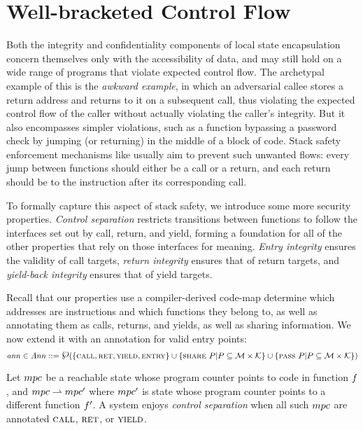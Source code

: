 \documentclass[acmsmall,review,anonymous]{acmart}\settopmatter{printfolios=true,printccs=false,printacmref=false}
\newcommand{\powerset}{\raisebox{.15\baselineskip}{\Large\ensuremath{\wp}}}
\begin{document}
\section{Well-bracketed Control Flow}
\label{sec:wbcf}

Both the integrity and confidentiality components of local state
encapsulation concern themselves only with the accessibility of data,
and may still hold on a wide range of programs that violate expected
control flow. The archetypal example of this is the {\em awkward example},
in which an adversarial callee stores a return address and returns to it
on a subsequent call, thus violating the expected control flow of the
caller without actually violating the caller's integrity. But it also
encompasses simpler violations, such as a function bypassing a password
check by jumping (or returning) in the middle of a block of code.
%
Stack safety enforcement mechanisms like \citet{Skorstengaard+19}
usually aim to prevent such unwanted flows: every jump between
functions should either be a call or a return, and each return should
be to the instruction after its corresponding call.

To formally capture this aspect of stack safety, we introduce some more
security properties. {\em Control separation} restricts transitions between
functions to follow the interfaces set out by call, return, and yield, forming
a foundation for all of the other properties that rely on those interfaces for
meaning. {\em Entry integrity} ensures the validity of call targets,
{\em return integrity} ensures that of return targets, and
{\em yield-back integrity} ensures that of yield targets.

Recall that our properties use a compiler-derived code-map determine
which addresses are instructions and which functions they belong to, as well
as annotating them as calls, returns, and yields, as well as sharing information.
We now extend it with an annotation for valid entry points:
\[\ann \in \ANNS ::= \powerset(\{\callmap, \retmap, \yieldmap, \entmap\} \cup
\{\sharemap ~ P | P \subseteq \MACHS \times \COMPONENTS \} \cup
\{\passmap ~ P | P \subseteq \MACHS \times \COMPONENTS \})\]


Let \(mpc\) be a reachable state whose program counter points to code in
function \(f\), and \(mpc \overset{}{\rightharpoonup} mpc'\) where
\(mpc'\) is state whose program counter points to a different function
\(f'\). A system enjoys {\em control separation} when all such \(mpc\)
are annotated \(\text{\sc call}\), \(\text{\sc ret}\), or \(\text{\sc yield}\).
\end{document}
